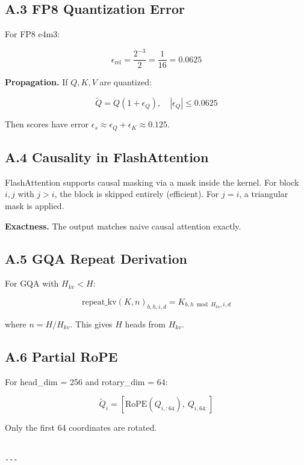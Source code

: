 \subsection{A.3 FP8 Quantization Error}

For FP8 e4m3:

\[
\epsilon_{\text{rel}} = \frac{2^{-3}}{2} = \frac{1}{16} = 0.0625
\tag{A.6}
\]

\textbf{Propagation.} If $Q, K, V$ are quantized:

\[
\tilde{Q} = Q(1 + \epsilon_Q), \quad |\epsilon_Q| \leq 0.0625
\tag{A.7}
\]

Then scores have error $\epsilon_s \approx \epsilon_Q + \epsilon_K \approx 0.125$.

\subsection{A.4 Causality in FlashAttention}

FlashAttention supports causal masking via a mask inside the kernel. For 
block $i, j$ with $j > i$, the block is skipped entirely (efficient). For 
$j = i$, a triangular mask is applied.

\textbf{Exactness.} The output matches naive causal attention exactly.

\subsection{A.5 GQA Repeat Derivation}

For GQA with $H_{kv} < H$:

\[
\text{repeat\_kv}(K, n)_{b, h, i, d} = K_{b, h \bmod H_{kv}, i, d}
\tag{A.8}
\]

where $n = H / H_{kv}$. This gives $H$ heads from $H_{kv}$.

\subsection{A.6 Partial RoPE}

For head\_dim = 256 and rotary\_dim = 64:

\[
\tilde{Q}_i = [\text{RoPE}(Q_{i, :64}), \ Q_{i, 64:}]
\tag{A.9}
\]

Only the first 64 coordinates are rotated.
\begin{lstlisting}

---
\end{lstlisting}